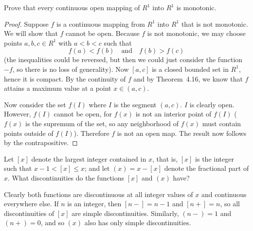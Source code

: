 Prove that every continuous open mapping of $R^1$ into $R^1$ is
monotonic.
\begin{proof}
  Suppose $f$ is a continuous mapping from $R^1$ into $R^1$ that is
  not monotonic. We will show that $f$ cannot be open. Because $f$ is
  not monotonic, we may choose points $a,b,c\in R^1$ with $a < b < c$
  such that
  \begin{equation*}
    f(a) < f(b)
    \quad\text{and}\quad
    f(b) > f(c)
  \end{equation*}
  (the inequalities could be reversed, but then we could just consider
  the function $-f$, so there is no loss of generality). Now $[a,c]$
  is a closed bounded set in $R^1$, hence it is compact. By the
  continuity of $f$ and by Theorem~4.16, we know that $f$ attains a
  maximum value at a point $x\in(a,c)$.

  Now consider the set $f(I)$ where $I$ is the segment $(a,c)$. $I$ is
  clearly open. However, $f(I)$ cannot be open, for $f(x)$ is not an
  interior point of $f(I)$ ($f(x)$ is the supremum of the set, so any
  neighborhood of $f(x)$ must contain points outside of
  $f(I)$). Therefore $f$ is not an open map. The result now follows by
  the contrapositive.
\end{proof}

 Let $[x]$ denote the largest integer contained in $x$,
that is, $[x]$ is the integer such that $x - 1<[x]\leq x$; and let
$(x) = x - [x]$ denote the fractional part of $x$. What
discontinuities do the functions $[x]$ and $(x)$ have?
\begin{solution}
  Clearly both functions are discontinuous at all integer values of
  $x$ and continuous everywhere else. If $n$ is an integer, then
  $[n-] = n - 1$ and $[n+] = n$, so all discontinuities of $[x]$ are
  simple discontinuities. Similarly, $(n-) = 1$ and $(n+) = 0$, and so
  $(x)$ also has only simple discontinuities.
\end{solution}

